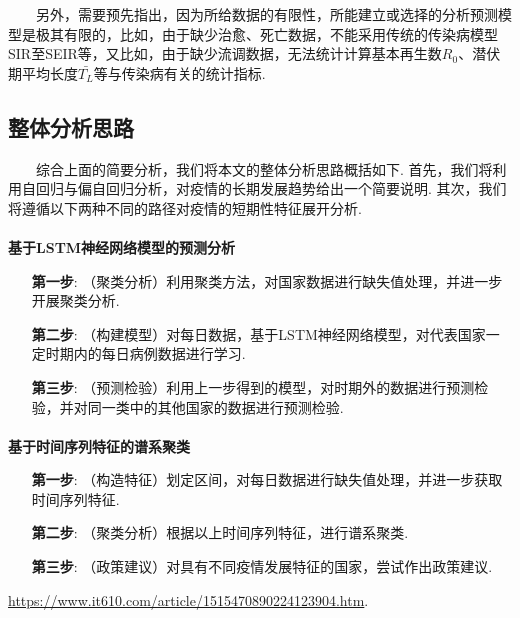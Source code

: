 \documentclass[a4paper, titlepage]{article}
\begin{document}
        　　另外，需要预先指出，因为所给数据的有限性，所能建立或选择的分析预测模型是极其有限的，比如，由于缺少治愈、死亡数据，不能采用传统的传染病模型SIR至SEIR等，又比如，由于缺少流调数据，无法统计计算基本再生数$R_0$、潜伏期平均长度$\bar{T_L}$等与传染病有关的统计指标. 

        \subsection{整体分析思路}
        　　综合上面的简要分析，我们将本文的整体分析思路概括如下. 首先，我们将利用自回归与偏自回归分析，对疫情的长期发展趋势给出一个简要说明. 其次，我们将遵循以下两种不同的路径对疫情的短期性特征展开分析.

        \paragraph{} \textbf{基于LSTM神经网络模型的预测分析}
        \vspace{5pt}
        \begin{adjustwidth}{1cm}{0cm}
        {\kaishu
        \begin{itemize}[itemsep=-1pt,topsep=1pt]
            \item [\textbf{第一步}:]（聚类分析）利用聚类方法，对国家数据进行缺失值处理，并进一步开展聚类分析.
            \item [\textbf{第二步}:]（构建模型）对每日数据，基于LSTM神经网络模型，对代表国家一定时期内的每日病例数据进行学习.
            \item [\textbf{第三步}:]（预测检验）利用上一步得到的模型，对时期外的数据进行预测检验，并对同一类中的其他国家的数据进行预测检验.
        \end{itemize}
        }
        \end{adjustwidth}
        \vspace{5pt}
        
        \paragraph{} \textbf{基于时间序列特征的谱系聚类}
        \vspace{5pt}
        \begin{adjustwidth}{1cm}{0cm}
        {\kaishu
        \begin{itemize}[itemsep=-1pt,topsep=1pt]
            \item [\textbf{第一步}:]（构造特征）划定区间，对每日数据进行缺失值处理，并进一步获取时间序列特征.
            \item [\textbf{第二步}:]（聚类分析）根据以上时间序列特征，进行谱系聚类.
            \item [\textbf{第三步}:]（政策建议）对具有不同疫情发展特征的国家，尝试作出政策建议.
        \end{itemize}
        }
        \end{adjustwidth}
        \vspace{5pt}
        \url{https://www.it610.com/article/1515470890224123904.htm}.
\end{document}
